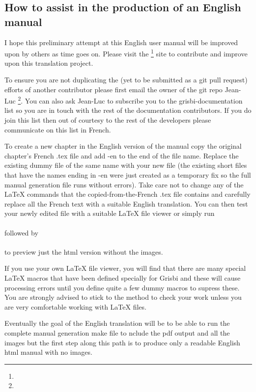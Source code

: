 \subsection*{How to assist in the production of an English manual}

I hope this preliminary attempt at this English user manual will be improved upon by others as time goes on. Please visit the \footnote{\urlGitDoc{}} site to contribute and improve upon this translation project. 

To ensure you are not duplicating the (yet to be submitted as a git pull request) efforts of another contributor please first email the owner of the git repo {Jean-Luc }\footnote{\urlJeanLucDuflotEmail{}}. You can also ask Jean-Luc to subscribe you to the grisbi-documentation list so you are in touch with the rest of the documentation contributors. If you do join this list then out of courtesy to the rest of the developers please communicate on this list in French.  


To create a new chapter in the English version of the manual copy the original chapter's French .tex file and add -en to the end of the file name.  Replace the existing dummy file of the same name with your new file (the existing short files that have the names ending in -en were just created as a temporary fix so the full manual generation  file runs without errors).  Take care not to change any of the LaTeX commands that the copied-from-the-French .tex file contains and carefully replace all the French text with a suitable English translation.  You can then test your newly edited file with a suitable LaTeX file viewer or simply run \\ \\followed by 
\\
\\to preview just the html version without the images.

 If you use your own LaTeX file viewer, you will find that there are many special LaTeX macros that have been defined specially for Grisbi and these will cause processing errors until you define quite a few dummy macros to supress these. You are strongly advised to stick to the  method to check your work unless you are very comfortable working with LaTeX files.

Eventually the goal of the English translation will be to be able to run the complete manual generation make file to nclude the pdf output and all the images but the first step along this path is to produce only a readable English html manual with no images.

